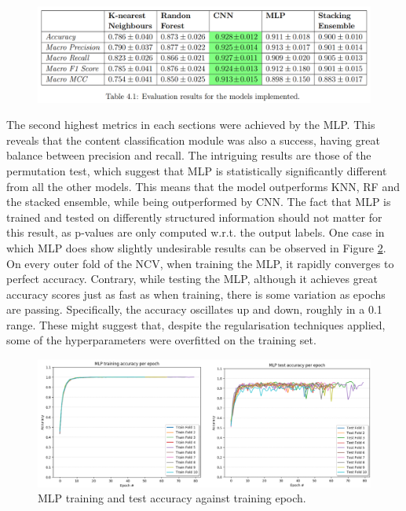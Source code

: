 \begin{figure}
    \centering
    \includegraphics[scale = 0.335]{Images/results_table.png}
    \label{results}
\end{figure}

The second highest metrics in each sections were achieved by the MLP. This reveals that the content classification module was also a success, having great balance between precision and recall. The intriguing results are those of the permutation test, which suggest that MLP is statistically significantly different from all the other models. This means that the model outperforms KNN, RF and the stacked ensemble, while being outperformed by CNN. The fact that MLP is trained and tested on differently structured information should not matter for this result, as p-values are only computed w.r.t. the output labels. One case in which MLP does show slightly undesirable results can be observed in Figure \ref{mlp_train_test}. On every outer fold of the NCV, when training the MLP, it rapidly converges to perfect accuracy. Contrary, while testing the MLP, although it achieves great accuracy scores just as fast as when training, there is some variation as epochs are passing. Specifically, the accuracy oscillates up and down, roughly in a 0.1 range. These might suggest that, despite the regularisation techniques applied, some of the hyperparameters were overfitted on the training set.

\begin{figure}[H]
  \centering
  \centerline{\includegraphics[scale=0.475]{Images/mlp_train_test.png}}
  \caption{MLP training and test accuracy against training epoch.}
  \label{mlp_train_test}
\end{figure}

